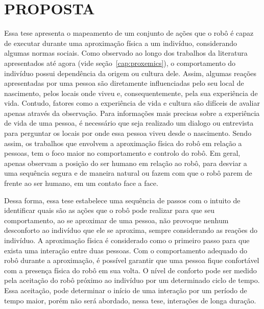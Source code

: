\chapter{PROPOSTA}
\label{cap:proposta}

Essa tese apresenta o mapeamento de um conjunto de ações que o robô é capaz de executar durante uma aproximação física a um indivíduo, considerando algumas normas sociais. Como observado ao longo dos trabalhos da literatura apresentados até agora (vide seção~\ref{cap:proxemics}), o comportamento do indivíduo possui dependência da origem ou cultura dele. Assim, algumas reações apresentadas por uma pessoa são diretamente influenciadas pelo seu local de nascimento, pelos locais onde viveu e, consequentemente, pela sua experiência de vida. Contudo, fatores como a experiência de vida e cultura são difíceis de avaliar apenas através da observação. Para informações mais precisas sobre a experiência de vida de uma pessoa, é necessário que seja realizado um dialogo ou entrevista para perguntar os locais por onde essa pessoa viveu desde o nascimento. Sendo assim, os trabalhos que envolvem a aproximação física do robô em relação a pessoas, tem o foco maior no comportamento e controlo do robô. Em geral, apenas observam a posição do ser humano em relação ao robô, para desviar a uma sequência segura e de maneira natural ou fazem com que o robô parem de frente ao ser humano, em um contato face a face.

Dessa forma, essa tese estabelece uma sequência de passos com o intuito de identificar quais são as ações que o robô pode realizar para que seu comportamento, ao se aproximar de uma pessoa, não provoque nenhum desconforto ao indivíduo que ele se aproxima, sempre considerando as reações do indivíduo. A aproximação física é considerado como o primeiro passo para que exista uma interação entre duas pessoas. Com o comportamento adequado do robô durante a aproximação, é possível garantir que uma pessoa fique confortável com a presença física do robô em sua volta. O nível de conforto pode ser medido pela aceitação do robô próximo ao indivíduo por um determinado ciclo de tempo. Essa aceitação, pode determinar o início de uma interação por um período de tempo maior, porém não será abordado, nessa tese, interações de longa duração.

